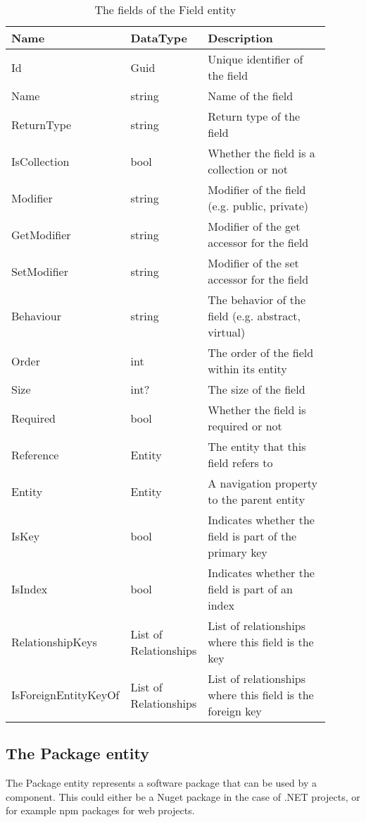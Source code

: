 \begin{table}[H]
\small
\begin{tabular}{ p{0.23\linewidth} p{0.23\linewidth} p{0.44\linewidth} }
\hline
\textbf{Name} & \textbf{DataType} & \textbf{Description} \\
\hline
Id & Guid & Unique identifier of the field \\
Name & string & Name of the field \\
ReturnType & string & Return type of the field \\
IsCollection & bool & Whether the field is a collection or not \\
Modifier & string & Modifier of the field (e.g. public, private) \\
GetModifier & string & Modifier of the get accessor for the field \\
SetModifier & string & Modifier of the set accessor for the field \\
Behaviour & string & The behavior of the field (e.g. abstract, virtual) \\
Order & int & The order of the field within its entity \\
Size & int? & The size of the field \\
Required & bool & Whether the field is required or not \\
Reference & Entity & The entity that this field refers to\\
Entity & Entity & A navigation property to the parent entity \\
IsKey & bool & Indicates whether the field is part of the primary key \\
IsIndex & bool & Indicates whether the field is part of an index \\
RelationshipKeys & List of Relationships & List of relationships where this field is the key \\
IsForeignEntityKeyOf & List of Relationships & List of relationships where this field is the foreign key \\
\hline
\end{tabular}
\caption{The fields of the Field entity}
\label{table:field_entity}
\end{table}

\subsection{The Package entity}

The Package entity represents a software package that can be used by a component. This
could either be a Nuget package in the case of .NET projects, or for example npm packages
for web projects.

